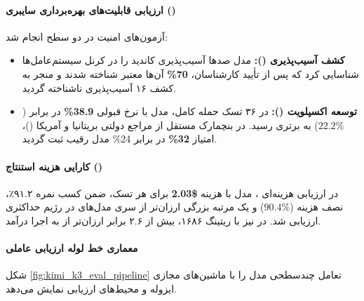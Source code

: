\paragraph*{ارزیابی قابلیت‌های بهره‌برداری سایبری ()}
آزمون‌های امنیت در دو سطح انجام شد:
\begin{itemize}
    \item \textbf{کشف آسیب‌پذیری ():} مدل صدها آسیب‌پذیری کاندید را در کرنل سیستم‌عامل‌ها شناسایی کرد که پس از تأیید کارشناسان، \textbf{70\%} آن‌ها معتبر شناخته شدند و منجر به کشف ۱۶ آسیب‌پذیری ناشناخته  گردید.
    \item \textbf{توسعه اکسپلویت ():} در ۳۶ تسک حمله کامل، مدل با نرخ قبولی \textbf{38.9\%} در برابر  ($22.2\%$) به برتری رسید. در بنچمارک مستقل  از مراجع دولتی بریتانیا و آمریکا ()، امتیاز \textbf{32\%} در برابر 24\% مدل رقیب ثبت گردید.
\end{itemize}

\paragraph*{کارایی هزینه استنتاج ()}
در ارزیابی هزینه‌ای ، مدل  با هزینه \textbf{\$2.03} برای هر تسک، ضمن کسب نمره ۹۱.۲٪، نصف هزینه  ($90.4\%$) و یک مرتبه بزرگی ارزان‌تر از سری مدل‌های  در رژیم حداکثری ارزیابی شد. در  نیز با ریتینگ ۱۶۸۶، بیش از ۲.۶ برابر ارزان‌تر از  به اجرا درآمد.

\paragraph*{معماری خط لوله ارزیابی عاملی}
شکل \ref{fig:kimi_k3_eval_pipeline} تعامل چندسطحی مدل را با ماشین‌های مجازی ایزوله و محیط‌های ارزیابی نمایش می‌دهد.

